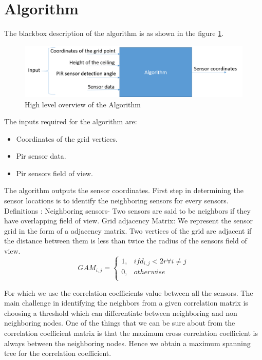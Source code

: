 \section{Algorithm}
The blackbox description of the algorithm is as shown in the figure \ref{fig:algorithm}. 
\begin{figure}
\includegraphics[scale=0.5]{./pics/algorithm.png}
\caption{High level overview of the Algorithm}
\label{fig:algorithm}
\end{figure}
The inputs required for the algorithm are:
\begin{itemize}
\item  Coordinates of the grid vertices.
\item Pir sensor data.
\item   Pir sensors field of view.
\end{itemize}
The algorithm outputs the sensor coordinates. 
First step in determining the sensor locations is to identify the neighboring sensors for every sensors. 
Definitions :
Neighboring sensors- Two sensors are said to be neighbors if they have overlapping field of view. 
Grid adjacency Matrix: We represent the sensor grid in the form of a adjacency matrix. Two vertices of the grid are adjacent if the distance between them is less than twice the radius of the sensors field of view.
\[
GAM_{i,j} = 
\begin{cases}
1, & if d_{i,j} < 2r \forall i \ne j\\
0, & otherwise\\
\end{cases}
	\]


 For which we use the correlation coefficients value between all the sensors. The main challenge in identifying the neighbors from a given correlation matrix is choosing a threshold which can differentiate between neighboring and non neighboring nodes. One of the things that we can be sure about from the correlation coefficient matrix is that the maximum cross correlation coefficient is always between the neighboring nodes. Hence we obtain a maximum spanning tree for the correlation coefficient.
